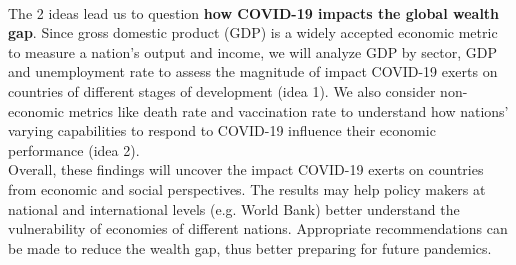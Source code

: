 \documentclass[fontsize=11pt]{article}
\begin{document}
\\
\noindent The 2 ideas lead us to question  \textbf{how COVID-19 impacts the global wealth gap}. Since gross domestic product (GDP) is a widely accepted economic metric to measure a nation’s output and income, we will analyze GDP by sector, GDP and unemployment rate to assess the magnitude of impact COVID-19 exerts on countries of different stages of development (idea 1). We also consider non-economic metrics like death rate and vaccination rate to understand how nations’ varying capabilities to respond to COVID-19 influence their economic performance (idea 2).  \\

\noindent Overall, these findings will uncover the impact COVID-19 exerts on countries from economic and social perspectives. The results may help policy makers at national and international levels (e.g. World Bank) better understand the vulnerability of economies of different nations. Appropriate recommendations can be made to reduce the wealth gap, thus better preparing for future pandemics.
\newpage
\end{document}
